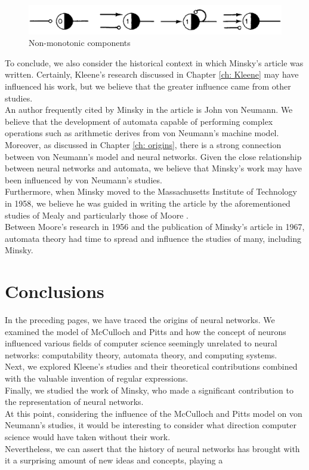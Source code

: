 \documentclass[10pt]{article}
\begin{document}
\begin{figure}[!t]
	\centering
	\includegraphics[width=12cm]{Immagini/componentiInibitorie.png}
	\caption{Non-monotonic components}
	\label{fig:componentiInibitorie}
\end{figure}


\vspace*{0.5cm}
To conclude, we also consider the historical context in which Minsky's article was written. Certainly, Kleene's research discussed in Chapter \ref{ch: Kleene} may have influenced his work, but we believe that the greater influence came from other studies.\\
An author frequently cited by Minsky in the article is John von Neumann. We believe that the development of automata capable of performing complex operations such as arithmetic derives from von Neumann's machine model. Moreover, as discussed in Chapter \ref{ch: origins}, there is a strong connection between von Neumann's model and neural networks. Given the close relationship between neural networks and automata, we believe that Minsky's work may have been influenced by von Neumann's studies.\\
Furthermore, when Minsky moved to the Massachusetts Institute of Technology in 1958, we believe he was guided in writing the article by the aforementioned studies of Mealy \cite{Mealy1955} and particularly those of Moore \cite{Moore1956}.\\
Between Moore's research in 1956 and the publication of Minsky's article in 1967, automata theory had time to spread and influence the studies of many, including Minsky.


\section{Conclusions}
In the preceding pages, we have traced the origins of neural networks. We examined the model of McCulloch and Pitts and how the concept of neurons influenced various fields of computer science seemingly unrelated to neural networks: computability theory, automata theory, and computing systems.\\
Next, we explored Kleene's studies and their theoretical contributions combined with the valuable invention of regular expressions.\\
Finally, we studied the work of Minsky, who made a significant contribution to the representation of neural networks.\\
At this point, considering the influence of the McCulloch and Pitts model on von Neumann's studies, it would be interesting to consider what direction computer science would have taken without their work.\\
Nevertheless, we can assert that the history of neural networks has brought with it a surprising amount of new ideas and concepts, playing a
\end{document}
